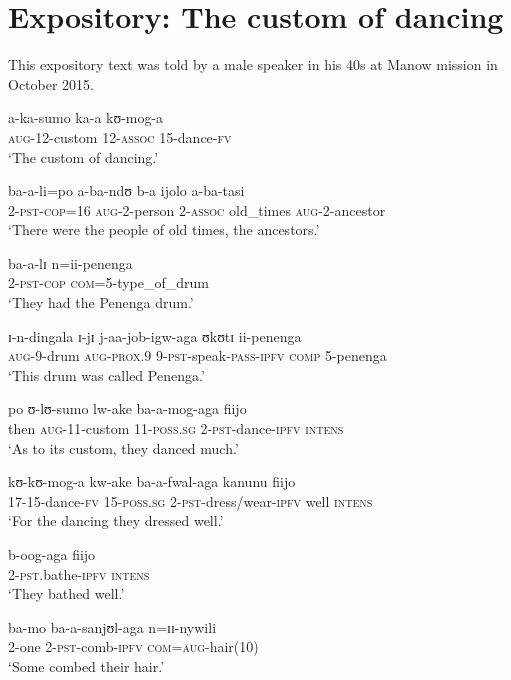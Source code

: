 \section{Expository: The custom of dancing}
This expository text was told by a male speaker in his 40s at Manow mission in October 2015.
\setcounter{equation}{0}
\begin{exe}
\ex \gll a-ka-sumo ka-a kʊ-mog-a\\
\textsc{aug}-12-custom 12-\textsc{assoc} 15-dance-\textsc{fv}\\
\glt \lq The custom of dancing.'

\ex \gll ba-a-li=po a-ba-ndʊ b-a ijolo a-ba-tasi\\
2-\textsc{pst}-\textsc{cop}=16 \textsc{aug}-2-person 2-\textsc{assoc} old\_times \textsc{aug}-2-ancestor\\
\glt \lq There were the people of old times, the ancestors.'

\ex \gll ba-a-lɪ n=ii-penenga\\
2-\textsc{pst}-\textsc{cop} \textsc{com}=5-type\_of\_drum\\
\glt \lq They had the Penenga drum.'

\ex \gll ɪ-n-dingala ɪ-jɪ j-aa-job-igw-aga ʊkʊtɪ ii-penenga\\
\textsc{aug}-9-drum \textsc{aug}-\textsc{prox.9} 9-\textsc{pst}-speak-\textsc{pass}-\textsc{ipfv} \textsc{comp} 5-penenga\\
\glt \lq This drum was called Penenga.'

\ex \gll po ʊ-lʊ-sumo lw-ake ba-a-mog-aga fiijo\\
then \textsc{aug}-11-custom 11-\textsc{poss.sg} 2-\textsc{pst}-dance-\textsc{ipfv} \textsc{intens}\\
\glt \lq As to its custom, they danced much.'

\ex \gll kʊ-kʊ-mog-a kw-ake ba-a-fwal-aga kanunu fiijo\\
17-15-dance-\textsc{fv} 15-\textsc{poss.sg} 2-\textsc{pst}-dress/wear-\textsc{ipfv} well \textsc{intens}\\
\glt \lq For the dancing they dressed well.'

\ex \gll b-oog-aga fiijo\\
2-\textsc{pst}.bathe-\textsc{ipfv} \textsc{intens}\\
\glt \lq They bathed well.'

\ex \gll ba-mo ba-a-sanjʊl-aga n=ɪɪ-nywili\\
2-one 2-\textsc{pst}-comb-\textsc{ipfv} \textsc{com}=\textsc{aug}-hair(10)\\
\glt \lq Some combed their hair.'


\end{exe}

